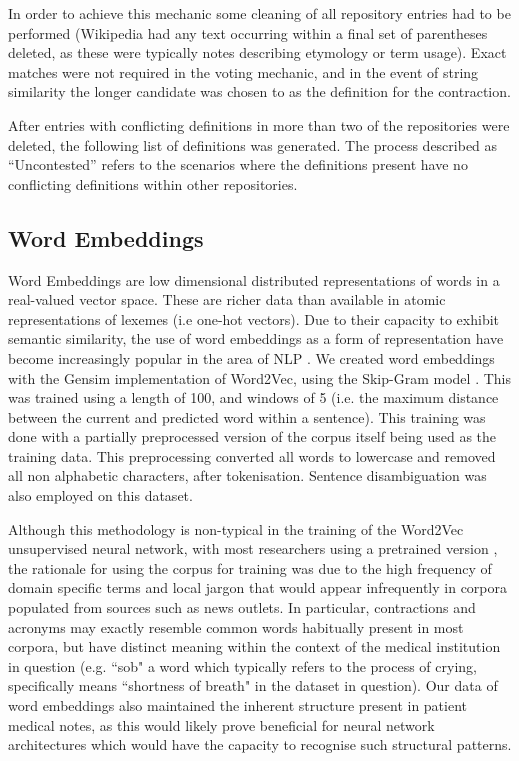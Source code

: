 In order to achieve this mechanic some cleaning of all repository entries had to be performed (Wikipedia had any text occurring within a final set of parentheses deleted, as these were typically notes describing etymology or term usage). Exact matches were not required in the voting mechanic, and in the event of string similarity the longer candidate was chosen to as the definition for the contraction.

After entries with conflicting definitions in more than two of the repositories were deleted, the following list of definitions was generated. The process described as “Uncontested” refers to the scenarios where the definitions present have no conflicting definitions within other repositories.

\subsection{Word Embeddings}
\label{section:word_embeddings}


 Word Embeddings are low dimensional distributed representations
of words in a real-valued vector space. These are richer data than available in atomic representations of lexemes (i.e one-hot vectors). Due to their capacity to exhibit semantic similarity, the use of word embeddings as a form of representation have become increasingly popular in the area of NLP \cite{goldberg2017neural}. We created word embeddings with the Gensim implementation \cite{rehurek_lrec} of Word2Vec, using the Skip-Gram model \cite{guthrie2006closer}. This was trained using a length of 100, and windows of 5 (i.e. the maximum distance between the current and predicted word within a sentence). This training was done with a partially preprocessed version of the corpus itself being used as the training data. This preprocessing converted all words to lowercase and removed all non alphabetic characters, after tokenisation. Sentence disambiguation was also employed on this dataset. 

Although this  methodology is non-typical in the training of the Word2Vec unsupervised neural network, with most researchers using a pretrained version \cite{feng2019deep,khatua2019tale,orkphol2019word}, the rationale for using the corpus for training was due to the high frequency of domain specific terms and local jargon that would appear infrequently in corpora populated from sources such as news outlets. In particular, contractions and acronyms may exactly resemble common words habitually present in most corpora, but have distinct meaning within the context of the medical institution in question (e.g. ``sob" a word which typically refers to the process of crying, specifically means ``shortness of breath" in the dataset in question). Our data of word embeddings also maintained the inherent structure present in patient medical notes, as this would likely prove beneficial for neural network architectures which would have the capacity to recognise such structural patterns.    



